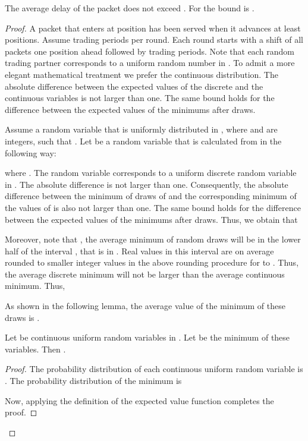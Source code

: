 \documentclass[letterpaper,10pt]{llncs}
\begin{document}
\begin{lemma}
\label{lem:delayUB}
The average delay of the packet does not exceed . For  the bound is .
\end{lemma}
\begin{proof}
A packet that enters at position  has been served when it advances 
at least  positions. Assume  trading periods per round.
Each round starts with a shift of all packets one position ahead followed by  trading periods.
Note that each random trading partner corresponds to a uniform random number
in . To admit a more elegant mathematical treatment we prefer the continuous 
distribution. The absolute difference between the expected values of the discrete and the continuous 
variables is not larger than one. The same bound holds for the difference between the 
expected values of the minimums after  draws.

Assume a random variable  that is uniformly distributed in ,
where  and  are integers, such that . Let  be a random variable
that is calculated from  in the following way:

where . 
The random variable  corresponds to a uniform discrete random variable in . The absolute difference  is not larger than one.
Consequently, the absolute difference between the minimum  of  draws of  and the corresponding minimum  of the  values of  is also not larger than one. 
The same bound holds for the difference between the expected values of the minimums after  draws.
Thus, we obtain that


\noindent
Moreover, note that , the average minimum of  random draws will be in the lower
half of the interval , that is in . Real values in this interval 
are on average rounded to smaller integer values in the above rounding procedure for 
to . Thus, the average discrete minimum will not be larger than the average
continuous minimum. Thus,


\noindent
As shown in the following lemma, the average value of the minimum of these  draws is .
\begin{lemma}
\label{lem:min}
Let  be continuous uniform random variables in . 
Let  be the minimum of these variables. Then .
\end{lemma}

\begin{proof}
The probability distribution of each continuous uniform random variable  is .
The probability distribution of the minimum  is 
 
Now, applying the definition of the expected value function completes the proof.
\end{proof}


\end{proof}
\end{document}
